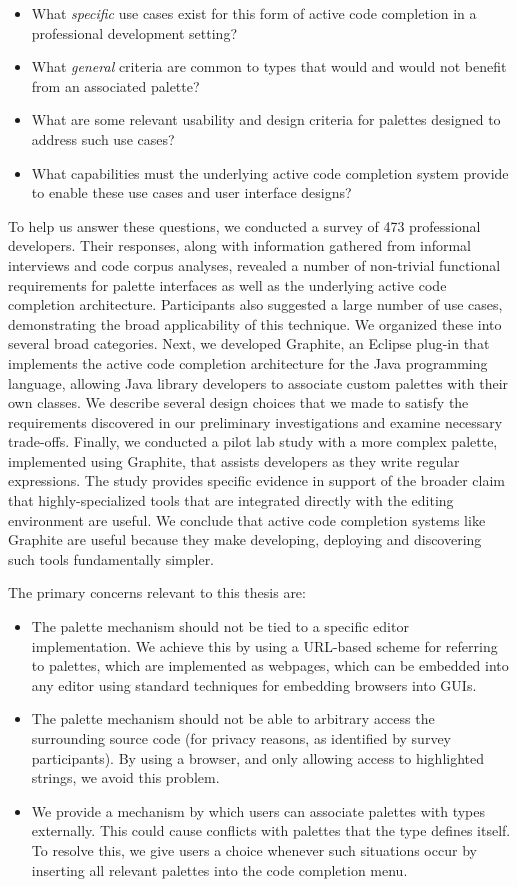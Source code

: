 \begin{itemize}
\item What {\it specific} use cases exist for this form of active code completion in a professional development setting? 
\item What {\it general} criteria are common to types that would and would not benefit from an associated palette?
\item What are some relevant usability and design criteria for palettes designed to address such use cases?
\item What capabilities must the underlying active code completion system provide to enable these use cases and user interface designs?
\end{itemize}

To help us answer these questions, we conducted a survey of 473 professional developers. Their responses, along with information gathered from informal interviews and code corpus analyses, revealed a number of non-trivial functional requirements for palette interfaces as well as the underlying active code completion architecture. Participants also suggested a large number of use cases, demonstrating the broad applicability of this technique. We organized these into several broad categories. Next, we developed Graphite, an Eclipse plug-in that implements the active code completion architecture for the Java programming language, allowing Java library developers to associate custom palettes with their own classes. We describe several design choices that we made to satisfy the requirements discovered in our preliminary investigations and examine necessary trade-offs. Finally, we conducted a pilot lab study with a more complex palette, implemented using Graphite, that assists developers as they write regular expressions. The study provides specific evidence in support of the broader claim that highly-specialized tools that are integrated directly with the editing environment are  useful. We conclude that active code completion systems like Graphite are useful because they make developing, deploying and discovering such tools fundamentally simpler.

The primary concerns relevant to this thesis are:
\begin{itemize}
\item The palette mechanism should not be tied to a specific editor implementation. We achieve this by using a URL-based scheme for referring to palettes, which are implemented as webpages, which can be embedded into any editor using standard techniques for embedding browsers into GUIs.
\item The palette mechanism should not be able to arbitrary access the surrounding source code (for privacy reasons, as identified by survey participants). By using a browser, and only allowing access to highlighted strings, we avoid this problem.
\item We provide a mechanism by which users can associate palettes with types externally. This could cause conflicts with palettes that the type defines itself. To resolve this, we give users a choice whenever such situations occur by inserting all relevant palettes into the code completion menu.
\end{itemize}

